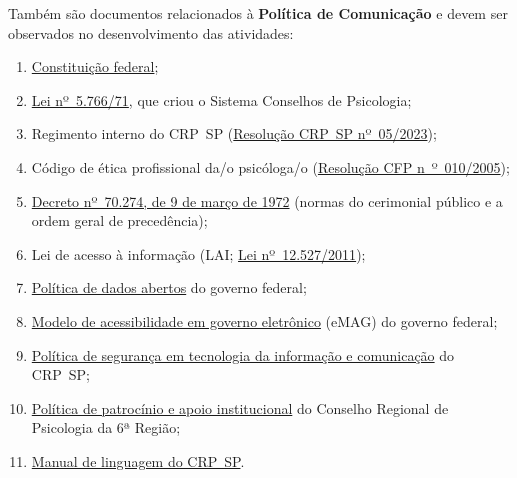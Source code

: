Também são documentos relacionados à \textbf{Política de Comunicação} e devem ser observados no desenvolvimento das atividades:

\begin{enumerate}

	\item
	      \href{https://www.planalto.gov.br/ccivil_03/constituicao/constituicao.htm}{Constituição federal};
	\item
	      \href{https://www.planalto.gov.br/ccivil_03/leis/l5766.htm}{Lei nº~5.766/71}, que criou o Sistema Conselhos de Psicologia;
	\item
	      Regimento interno do CRP~SP
	      (\href{https://transparencia.cfp.org.br/crp06/legislacao/regimento-interno-do-conselho-regional-de-psicologia-de-sao-paulo-6a-regiao-aprovado-pela-resolucao-no-5-de-22-de-marco-de-2023/}{Resolução CRP~SP nº~05/2023});
	\item
	      Código de ética profissional da/o psicóloga/o
	      (\href{https://atosoficiais.com.br/cfp/resolucao-do-exercicio-profissional-n-10-2005-aprova-o-codigo-de-etica-profissional-do-psicologo}{Resolução CFP n~º~010/2005});
	\item
	      \href{https://www.planalto.gov.br/ccivil_03/decreto/d70274.htm}{Decreto nº~70.274, de 9 de março de 1972} (normas do cerimonial público e a ordem geral de precedência);
	\item
	      Lei de acesso à informação (LAI; \href{https://www.planalto.gov.br/ccivil_03/_ato2011-2014/2011/lei/l12527.htm}{Lei nº~12.527/2011});
	\item
	      \href{https://dados.gov.br/dados/conteudo/politica-de-dados-abertos}{Política de dados abertos} do governo federal;
	\item 
		  \href{https://emag.governoeletronico.gov.br/}{{Modelo de acessibilidade em governo eletrônico}} (eMAG) do governo federal;
	\item
	      \href{https://transparencia.cfp.org.br/wp-content/uploads/sites/29/2024/08/Politica-de-TI-2-Edicao.pdf}{Política de segurança em tecnologia da informação e comunicação} do CRP~SP;
	\item
	      \href{https://transparencia.cfp.org.br/crp06/legislacao/portaria-crp-n-49-2024-institui-a-politica-de-patrocinio-e-apoio-institucional-do-conselho-regional-de-psicologia-da-6a-regiao-crp-06/}{Política de patrocínio e apoio institucional} do Conselho Regional de Psicologia da 6ª Região;
	\item
	      \href{http://cedoc.crpsp.org.br/handle/1/2938}{Manual de linguagem do CRP~SP}.
\end{enumerate}

